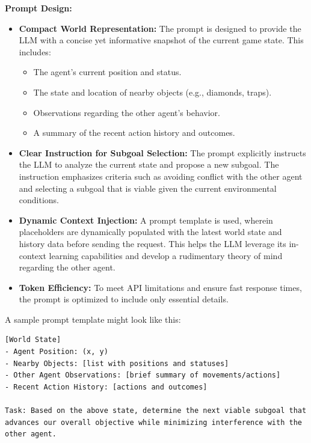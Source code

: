 \documentclass{article}
\begin{document}
\textbf{Prompt Design:}
\begin{itemize}
    \item \textbf{Compact World Representation:}  
    The prompt is designed to provide the LLM with a concise yet informative snapshot of the current game state. This includes:
    \begin{itemize}
        \item The agent’s current position and status.
        \item The state and location of nearby objects (e.g., diamonds, traps).
        \item Observations regarding the other agent’s behavior.
        \item A summary of the recent action history and outcomes.
    \end{itemize}
    
    \item \textbf{Clear Instruction for Subgoal Selection:}  
    The prompt explicitly instructs the LLM to analyze the current state and propose a new subgoal. The instruction emphasizes criteria such as avoiding conflict with the other agent and selecting a subgoal that is viable given the current environmental conditions.
    
    \item \textbf{Dynamic Context Injection:}  
    A prompt template is used, wherein placeholders are dynamically populated with the latest world state and history data before sending the request. This helps the LLM leverage its in-context learning capabilities and develop a rudimentary theory of mind regarding the other agent.
    
    \item \textbf{Token Efficiency:}  
    To meet API limitations and ensure fast response times, the prompt is optimized to include only essential details.
\end{itemize}

A sample prompt template might look like this:

\begin{verbatim}
[World State]
- Agent Position: (x, y)
- Nearby Objects: [list with positions and statuses]
- Other Agent Observations: [brief summary of movements/actions]
- Recent Action History: [actions and outcomes]

Task: Based on the above state, determine the next viable subgoal that advances our overall objective while minimizing interference with the other agent.
\end{verbatim}
\end{document}
